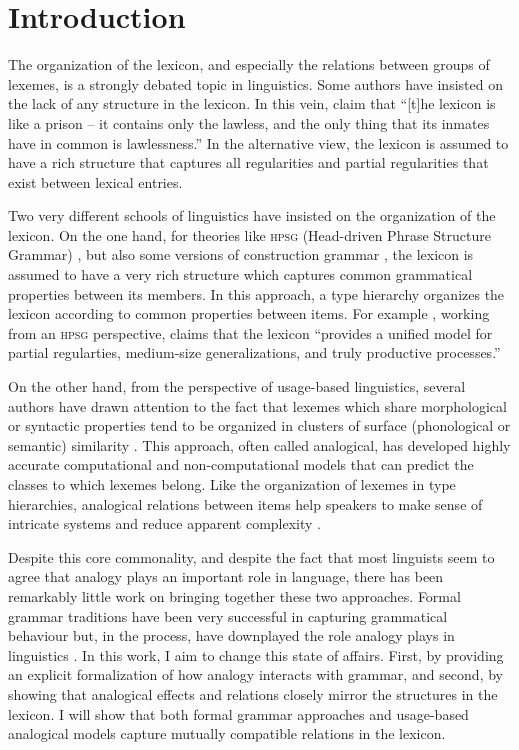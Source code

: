 \chapter{Introduction}\label{chap:introduction}
The organization of the lexicon, and especially the relations between groups of lexemes, is a strongly debated topic in linguistics. Some authors have insisted on the lack of any structure in the lexicon.
In this vein, \textcite[3]{DiSciullo.1987} claim that ``[t]he lexicon is like a prison -- it contains only the lawless, and the only thing that its inmates have in common is lawlessness.''
In the alternative view, the lexicon is assumed to have a rich structure that captures all regularities and partial regularities that exist between lexical entries.

Two very different schools of linguistics have insisted on the organization of the lexicon.
On the one hand, for theories like \textsc{hpsg} (Head-driven Phrase Structure Grammar) \autocite{Pollard.1994}, but also some versions of construction grammar \autocite{Fillmore.1995}, the lexicon is assumed to have a very rich structure which captures common grammatical properties between its members.
In this approach, a type hierarchy organizes the lexicon according to common properties between items.
For example \textcite[4, among others]{Koenig.1999}, working from an \textsc{hpsg} perspective, claims that the lexicon ``provides a unified model for partial regularties, medium-size generalizations, and truly productive processes.''

On the other hand, from the perspective of usage-based linguistics, several authors have drawn attention to the fact that lexemes which share morphological or syntactic properties tend to be organized in clusters of surface (phonological or semantic) similarity \autocites{Bybee.1982, Eddington.1996, Skousen.1989}.
This approach, often called analogical, has developed highly accurate computational and non-computational models that can predict the classes to which lexemes belong.
Like the organization of lexemes in type hierarchies, analogical relations between items help speakers to make sense of intricate systems and reduce apparent complexity \autocite{Kopcke.1984}.

Despite this core commonality, and despite the fact that most linguists seem to agree that analogy plays an important role in language, there has been remarkably little work on bringing together these two approaches.
Formal grammar traditions have been very successful in capturing grammatical behaviour but, in the process, have downplayed the role analogy plays in linguistics \autocite{Anderson.2015}.
In this work, I aim to change this state of affairs.
First, by providing an explicit formalization of how analogy interacts with grammar, and second, by showing that analogical effects and relations closely mirror the structures in the lexicon.
I will show that both formal grammar approaches and usage-based analogical models capture mutually compatible relations in the lexicon.

